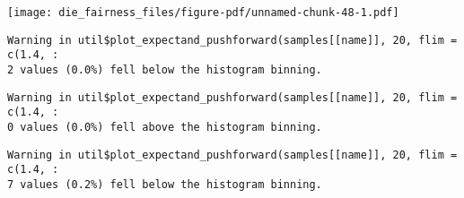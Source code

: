 \documentclass[
  letterpaper,
  DIV=11,
  numbers=noendperiod]{scrartcl}
\newenvironment{Shaded}{\begin{snugshade}}{\end{snugshade}}
\newcommand{\AttributeTok}[1]{\textcolor[rgb]{0.40,0.45,0.13}{#1}}
\newcommand{\ControlFlowTok}[1]{\textcolor[rgb]{0.00,0.23,0.31}{#1}}
\newcommand{\DecValTok}[1]{\textcolor[rgb]{0.68,0.00,0.00}{#1}}
\newcommand{\FloatTok}[1]{\textcolor[rgb]{0.68,0.00,0.00}{#1}}
\newcommand{\FunctionTok}[1]{\textcolor[rgb]{0.28,0.35,0.67}{#1}}
\newcommand{\NormalTok}[1]{\textcolor[rgb]{0.00,0.23,0.31}{#1}}
\newcommand{\OtherTok}[1]{\textcolor[rgb]{0.00,0.23,0.31}{#1}}
\newcommand{\SpecialCharTok}[1]{\textcolor[rgb]{0.37,0.37,0.37}{#1}}
\newcommand{\StringTok}[1]{\textcolor[rgb]{0.13,0.47,0.30}{#1}}
\begin{document}
\begin{Shaded}
\end{Shaded}

\texttt{[image: die\_fairness\_files/figure-pdf/unnamed-chunk-48-1.pdf]}

\begin{verbatim}
Warning in util$plot_expectand_pushforward(samples[[name]], 20, flim = c(1.4, :
2 values (0.0%) fell below the histogram binning.
\end{verbatim}

\begin{verbatim}
Warning in util$plot_expectand_pushforward(samples[[name]], 20, flim = c(1.4, :
0 values (0.0%) fell above the histogram binning.
\end{verbatim}

\begin{verbatim}
Warning in util$plot_expectand_pushforward(samples[[name]], 20, flim = c(1.4, :
7 values (0.2%) fell below the histogram binning.
\end{verbatim}
\end{document}
